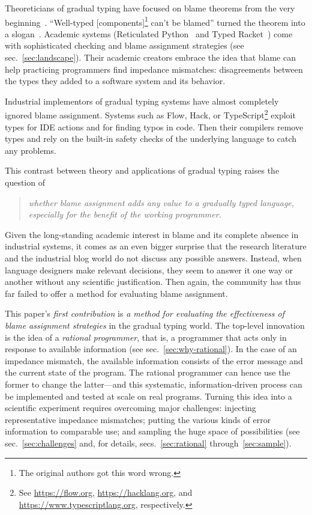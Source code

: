 
Theoreticians of gradual typing have focused on blame theorems from the very
beginning~\cite{mf-toplas-2009, tf-dls-2006}. ``Well-typed
[components]\footnote{The original authors got this word wrong.} can't be
blamed'' turned the theorem into a slogan~\cite{wf-esop-2009}. Academic systems
(Reticulated Python~\cite{vsc-dls-2019, vss-popl-2017, vksb-dls-2014} and Typed
Racket~\cite{tf-dls-2006,tf-popl-2008,tfffgksst-snapl-2017,tf-icfp-2010}) come
with sophisticated checking and blame assignment strategies (see sec.~\ref{sec:landscape}). Their academic creators embrace
the idea that blame can help practicing programmers find impedance mismatches: disagreements
between the types they added to a software system and its behavior.

Industrial implementors of gradual typing systems have almost
completely ignored blame assignment.  Systems such as Flow, Hack, or
TypeScript\footnote{See \url{https://flow.org},
\url{https://hacklang.org}, and \url{https://www.typescriptlang.org},
respectively.} exploit types for IDE actions and for finding typos in
code. Then their compilers remove types and rely on the built-in
safety checks of the underlying language to catch any problems.

This contrast between theory and applications of gradual typing raises the question of
\begin{quote}
 \it
 whether blame assignment adds any value to a gradually typed language,
 especially for the benefit of the working programmer.
\end{quote}
Given the long-standing academic interest in blame and its complete absence in
industrial systems, it comes as an even bigger surprise that the research
literature and the industrial blog world do not discuss any possible answers.
Instead, when language designers make relevant decisions, they seem to answer it
one way or another without any scientific justification. Then again, the
community has thus far failed to offer a method for evaluating blame assignment.

This paper's {\em first contribution\/} is {\em a method for evaluating the
effectiveness of blame assignment strategies\/} in the gradual typing world.
The top-level innovation is the idea of a {\em rational programmer\/}, that is,
a programmer that acts only in response to available information (see
sec.~\ref{sec:why-rational}). In the case of an impedance mismatch, the
available information consists of the error message and the current state of the
program. The rational programmer can hence use the former to change the
latter---and this systematic, information-driven process can be implemented and
tested at scale on real programs.  Turning this idea into a scientific
experiment requires overcoming major challenges: injecting representative
impedance mismatches; putting the various kinds of error information to
comparable use; and sampling the huge space of possibilities (see
sec.~\ref{sec:challenges} and, for details, secs.~\ref{sec:rational} through~\ref{sec:sample}).

